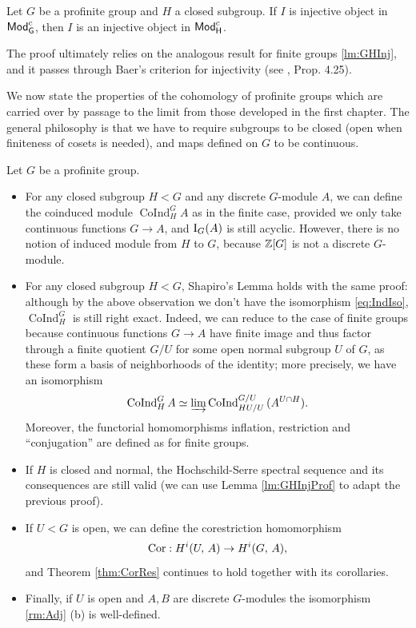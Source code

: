\documentclass[a4paper, oneside]{memoir}
\begin{document}
\begin{lemma}\label{lm:GHInjProf}
	Let $G$ be a profinite group and $H$ a closed subgroup. If $I$ is injective object in $\mathsf{Mod}_\mathsf{G}^{c}$, then $I$ is an injective object in $\mathsf{Mod}_\mathsf{H}^{c}$.
\end{lemma}
The proof ultimately relies on the analogous result for finite groups \ref{lm:GHInj}, and it passes through Baer's criterion for injectivity (see \cite{Harari}, Prop. 4.25).

We now state the properties of the cohomology of profinite groups which are carried over by passage to the limit from those developed in the first chapter. The general philosophy is that we have to require subgroups to be closed (open when finiteness of cosets is needed), and maps defined on $G$ to be continuous.
\begin{remark}
	Let $G$ be a profinite group.
	\begin{itemize}
		\item For any closed subgroup $H<G$ and any discrete $G$-module $A$, we can define the coinduced module $\operatorname{CoInd}_{H}^{G}{A}$ as in the finite case, provided we only take continuous functions $G\to A$, and $\operatorname{I}_{G}(A)$ is still acyclic. However, there is no notion of induced module from $H$ to $G$, because $\mathbb{Z}[G]$ is not a discrete $G$-module.
		\item For any closed subgroup $H<G$, Shapiro's Lemma holds with the same proof: although by the above observation we don't have the isomorphism \eqref{eq:IndIso}, $\operatorname{CoInd}_{H}^{G}$ is still right exact. Indeed, we can reduce to the case of finite groups because continuous functions $G\to A$ have finite image and thus factor through a finite quotient $G/U$ for some open normal subgroup $U$ of $G$, as these
		      form a basis of neighborhoods of the identity; more precisely, we have an isomorphism
		      \[
			      \operatorname{CoInd}_{H}^{G}{A}\simeq \varinjlim{\operatorname{CoInd}_{HU/U}^{G/U}{(A^{U\cap H})}}.
		      \]
		      Moreover, the functorial homomorphisms inflation, restriction and ``conjugation'' are defined as for finite groups.
		\item If $H$ is closed and normal, the Hochschild-Serre spectral sequence and its consequences are still valid (we can use Lemma \ref{lm:GHInjProf} to adapt the previous proof).
		\item If $U<G$ is open, we can define the corestriction homomorphism
		      \[
			      \operatorname{Cor}:H^{i}( U, \, A )\to H^{i}( G, \, A ),
		      \]
		      and Theorem \eqref{thm:CorRes} continues to hold together with its corollaries.
		\item Finally, if $U$ is open and $A,B$ are discrete $G$-modules the isomorphism \ref{rm:Adj} (b) is well-defined.
	\end{itemize}
\end{remark}
\end{document}
